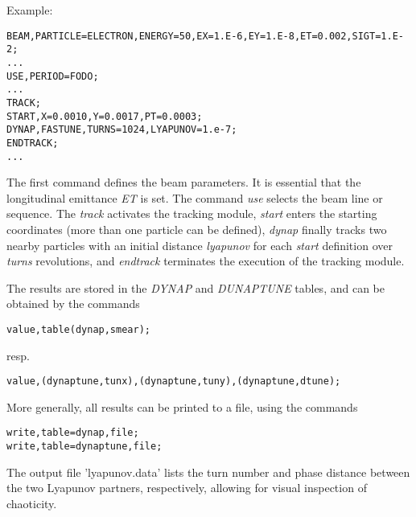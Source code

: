 Example:
\begin{verbatim}
BEAM,PARTICLE=ELECTRON,ENERGY=50,EX=1.E-6,EY=1.E-8,ET=0.002,SIGT=1.E-2;
...
USE,PERIOD=FODO;
...
TRACK;
START,X=0.0010,Y=0.0017,PT=0.0003;
DYNAP,FASTUNE,TURNS=1024,LYAPUNOV=1.e-7;
ENDTRACK;
...

\end{verbatim}

The first command defines the beam parameters. It is  essential that the longitudinal emittance \textit{ET} is set. The command \textit{use} selects the beam line or sequence. The \textit{track} activates the tracking module, \textit{start } enters the starting coordinates (more than one particle can be defined),  \textit{dynap} finally tracks two nearby particles  with an initial distance \textit{lyapunov}  for each \textit{start} definition over \textit{ turns } revolutions, and \textit{endtrack} terminates the execution of the tracking module.

The results are stored in the \textit{DYNAP} and \textit{ DUNAPTUNE } tables, and can be obtained by the commands 
 
\begin{verbatim}
value,table(dynap,smear);
\end{verbatim} 
resp. 
\begin{verbatim}
value,(dynaptune,tunx),(dynaptune,tuny),(dynaptune,dtune);
\end{verbatim}

More generally, all results can be printed to a file, using the commands 
 
\begin{verbatim}
write,table=dynap,file;
write,table=dynaptune,file;
\end{verbatim}

The output file 'lyapunov.data' lists  the turn number and phase distance between the  two Lyapunov partners, respectively, allowing for visual inspection of chaoticity.
 
